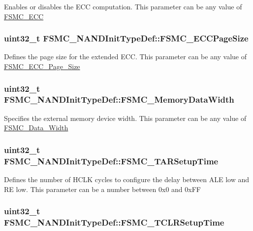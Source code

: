 \label{structFSMC__NANDInitTypeDef_a58d0510c0ce0ae3d1e3863bf8f571377}
Enables or disables the ECC computation. This parameter can be any value of \hyperlink{group__FSMC__ECC}{FSMC\_\-ECC} \hypertarget{structFSMC__NANDInitTypeDef_a7ed6a25710ba724a7a8f90af60130cf6}{
\subsubsection[{FSMC\_\-ECCPageSize}]{\setlength{\rightskip}{0pt plus 5cm}uint32\_\-t {\bf FSMC\_\-NANDInitTypeDef::FSMC\_\-ECCPageSize}}}
\label{structFSMC__NANDInitTypeDef_a7ed6a25710ba724a7a8f90af60130cf6}
Defines the page size for the extended ECC. This parameter can be any value of \hyperlink{group__FSMC__ECC__Page__Size}{FSMC\_\-ECC\_\-Page\_\-Size} \hypertarget{structFSMC__NANDInitTypeDef_ab4a4f56aab3150d8fb02aaf092db0235}{
\subsubsection[{FSMC\_\-MemoryDataWidth}]{\setlength{\rightskip}{0pt plus 5cm}uint32\_\-t {\bf FSMC\_\-NANDInitTypeDef::FSMC\_\-MemoryDataWidth}}}
\label{structFSMC__NANDInitTypeDef_ab4a4f56aab3150d8fb02aaf092db0235}
Specifies the external memory device width. This parameter can be any value of \hyperlink{group__FSMC__Data__Width}{FSMC\_\-Data\_\-Width} \hypertarget{structFSMC__NANDInitTypeDef_a014c1b8977b454ac15654d93dbb7dff9}{
\subsubsection[{FSMC\_\-TARSetupTime}]{\setlength{\rightskip}{0pt plus 5cm}uint32\_\-t {\bf FSMC\_\-NANDInitTypeDef::FSMC\_\-TARSetupTime}}}
\label{structFSMC__NANDInitTypeDef_a014c1b8977b454ac15654d93dbb7dff9}
Defines the number of HCLK cycles to configure the delay between ALE low and RE low. This parameter can be a number between 0x0 and 0xFF \hypertarget{structFSMC__NANDInitTypeDef_a633c7be46a1d281916b9f2e34fa3d36a}{
\subsubsection[{FSMC\_\-TCLRSetupTime}]{\setlength{\rightskip}{0pt plus 5cm}uint32\_\-t {\bf FSMC\_\-NANDInitTypeDef::FSMC\_\-TCLRSetupTime}}}
